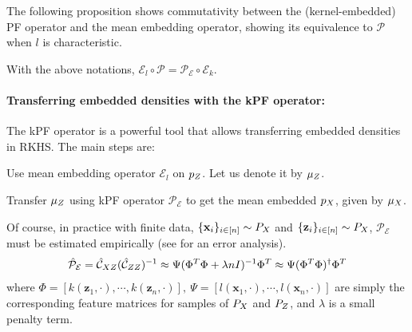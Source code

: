 The following proposition shows commutativity between the (kernel-embedded) PF operator and the mean embedding operator, showing its equivalence to $\mathcal{P}$ when $l$ is characteristic.

\begin{proposition}
  \label{prop:klus}
   With the above notations, $\mathcal{E}_l \circ \mathcal{P} = \mathcal{P}_{\mathcal{E}} \circ \mathcal{E}_k$.
\end{proposition}

\paragraph{Transferring embedded densities with the kPF operator:} The kPF operator is a powerful tool that allows transferring embedded densities in RKHS. The main steps are:
\begin{tcolorbox}[top=0mm,bottom=0mm]
\begin{compactenum}[\bfseries (1)] \item Use mean embedding operator $\mathcal{E}_{l}$ on $p_{\var{z}}$. Let us denote it by $\mu_{\var{z}}$.  \item  Transfer $\mu_{\var{z}}$ using kPF operator $\mathcal{P}_\mathcal{E}$ to get the mean embedded $p_{\var{x}}$, given by $\mu_{\var{x}}$.\end{compactenum}
\end{tcolorbox}
Of course, in practice with finite data, $\{\mathbf{x}_i\}_{i \in [n]} \sim P_{\var{x}}$ and $\{\mathbf{z}_i\}_{i \in [n]} \sim P_{\var{x}}$, $\mathcal{P}_\mathcal{E}$ must be estimated empirically (see \citet{klus2020eigendecompositions} for an error analysis).
\begin{align}
\hat{\mathcal{P}}_\mathcal{E} = \hat{\mathcal{C}}_{\var{x}\var{z}}(\hat{\mathcal{C}}_{\var{z}\var{z}})^{-1} \nonumber \approx \Psi(\Phi^T\Phi + \lambda n I)^{-1}\Phi^T \approx \Psi(\Phi^T\Phi)^\dagger\Phi^T
\end{align}
where $\Phi = [k(\mathbf{z}_1, \cdot), \cdots, k(\mathbf{z}_n, \cdot)],~
 \Psi = [l(\mathbf{x}_1,\cdot), \cdots, l(\mathbf{x}_n, \cdot)]$ are simply the corresponding feature matrices for samples of $P_{\var{x}}$ and $P_{\var{z}}$, and $\lambda$ is a small penalty term.

